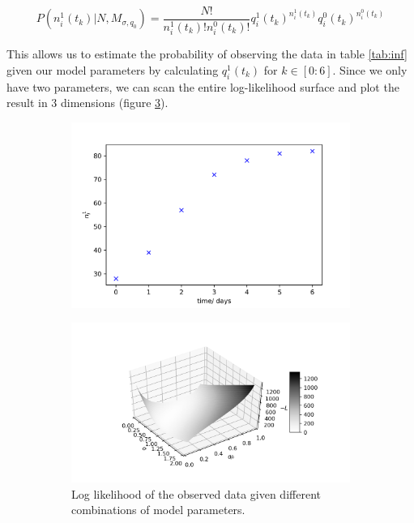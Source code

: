 \documentclass{article}
\begin{document}
\begin{equation*}
P(n_i^1(t_k)|N, M_{\sigma,q_0}) = \dfrac{N!}{n_i^1(t_k)! n_i^0(t_k)!}q_i^1(t_k)^{n_i^1(t_k)} q_i^0(t_k)^{n_i^0(t_k)} 
\end{equation*}

This allows us to estimate the probability of observing the data in table \ref{tab:inf} given our model parameters by calculating $q_i^1(t_k)$ for $k \in [0:6]$. Since we only have two parameters, we can scan the entire log-likelihood surface and plot the result in 3 dimensions (figure \ref{fig:Lsurf}).

\begin{figure}[h]
	\centering
	\begin{subfigure}[t]{0.40\linewidth}
		\centering
		\includegraphics[width = 1.0\linewidth, trim={0 0 0 0}, clip=true]{data.png}
		\label{fig:data}	
	\end{subfigure}%
	\hspace{0.05\linewidth}
	\begin{subfigure}[t]{0.50\linewidth}
		\centering
		\includegraphics[width = 1.0\linewidth, trim={80 30 50 50}, clip=true]{Lsurf.png}
		\caption{Log likelihood of the observed data given different combinations of model parameters.}
		\label{fig:Lsurf}
	\end{subfigure}
\caption{}
\end{figure}
\end{document}
